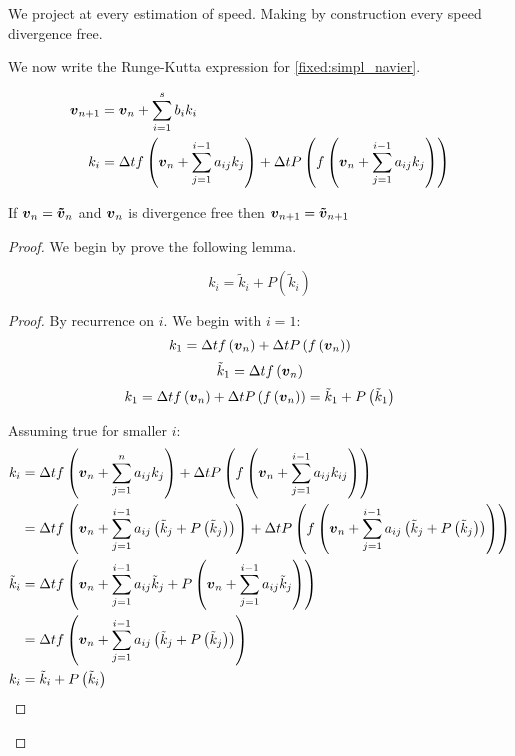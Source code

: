 We project at every estimation of speed. Making by construction every speed divergence free.

We now write the Runge-Kutta expression for \ref{fixed:simpl_navier}.

\begin{align}
	{\boldsymbol {v}}_{n+1}&={\boldsymbol {v}}_{n}+\sum_{i=1}^{s}b_{i}k_{i}\\
	k_{i}&=\Delta t f\left({\boldsymbol {v}}_{n}+\sum_{j=1}^{i-1}a_{ij}k_{j}\right)+\Delta t P\left(f\left({\boldsymbol {v}}_{n}+\sum_{j=1}^{i-1}a_{ij}k_{j}\right)\right)
\end{align}

\begin{thm}
If ${\boldsymbol {v}}_{n}={\boldsymbol {\tilde{v}}}_{n}$ and ${\boldsymbol {v}}_n$ is divergence free then ${\boldsymbol {v}}_{n+1}={\boldsymbol {\tilde{v}}}_{n+1}$ 
\end{thm}
 \begin{proof}
 We begin by prove the following lemma.
 \begin{lem}
 \begin{equation}
  k_{i}=\tilde{k}_{i}+P(\tilde{k}_{i})
 \end{equation}
 \end{lem}
 \begin{proof}
 By recurrence on $i$.
 We begin with $i=1$:
 \begin{equation}
  k_{1}=\Delta tf\left({\boldsymbol {v}}_n\right)+\Delta tP\left(f\left({\boldsymbol {v}}_n\right)\right)
 \end{equation}
\begin{equation}
 \tilde{k}_{1}=\Delta tf\left({\boldsymbol {v}}_n\right)
\end{equation}
 \begin{equation}
  k_{1}=\Delta t f\left({\boldsymbol {v}}_n\right)+\Delta tP\left(f\left({\boldsymbol {v}}_n\right)\right)=\tilde{k}_1+P\left(\tilde{k}_1\right)
 \end{equation}
 
 Assuming true for smaller $i$:
 \begin{align*}
  k_{i}&=\Delta tf\left({\boldsymbol {v}}_n+\sum_{j=1}^{n}a_{ij}k_{j}\right)+\Delta tP\left(f\left({\boldsymbol {v}}_n+\sum_{j=1}^{i-1}a_{ij}k_{ij}\right)\right)\\
  &=\Delta tf\left({\boldsymbol {v}}_n+\sum_{j=1}^{i-1}a_{ij}\left(\tilde{k}_{j}+P\left(\tilde{k}_{j}\right)\right)\right)+\Delta tP\left(f\left({\boldsymbol {v}}_n+\sum_{j=1}^{i-1}a_{ij}\left(\tilde{k}_{j}+P\left(\tilde{k}_{j}\right)\right)\right)\right)\\
  \tilde{k}_{i}&=\Delta tf\left({\boldsymbol {v}}_n+\sum_{j=1}^{i-1}a_{ij}\tilde{k}_{j}+P\left({\boldsymbol {v}}_n+\sum_{j=1}^{i-1}a_{ij}\tilde{k}_{j}\right)\right)\\
  &=\Delta tf\left({\boldsymbol {v}}_n+\sum_{j=1}^{i-1}a_{ij}\left(\tilde{k}_{j}+P\left(\tilde{k}_{j}\right)\right)\right)\\
  k_{i}&=\tilde{k}_{i}+P\left(\tilde{k}_{i}\right)
 \end{align*}
 \end{proof}
 

\end{proof}

